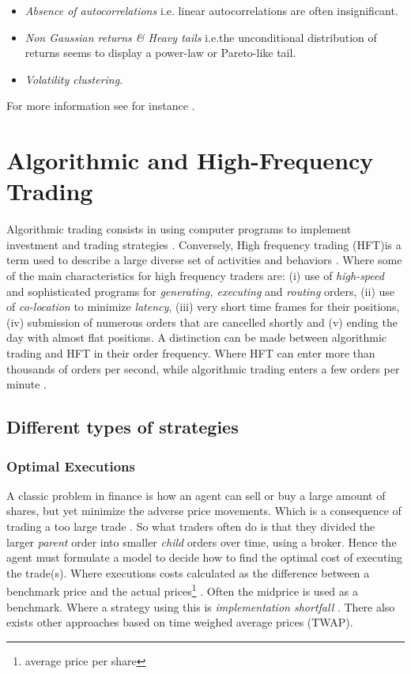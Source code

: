 \documentclass{kththesis}
\theoremstyle{definition}
\begin{document}
\begin{itemize}
    \item \textit{Absence of autocorrelations} i.e. linear autocorrelations are often insignificant. 
    \item \textit{Non Gaussian returns \& Heavy tails} i.e.the unconditional distribution of returns seems to display a power-law or Pareto-like tail.
    \item \textit{Volatility clustering}. 
\end{itemize}
For more information see for instance \textcite{cont2001empirical}.

\section{Algorithmic and High-Frequency Trading}
Algorithmic trading consists in using computer programs to implement investment and trading strategies \parencite{abergel2012market}. Conversely, High frequency trading (HFT)is a term used to describe a large diverse set of activities and behaviors \parencite{o2015high}. Where some of the main characteristics for high frequency traders are: (i) use of \textit{high-speed} and sophisticated programs for \textit{generating, executing} and \textit{routing} orders, (ii) use of \textit{co-location} to minimize \textit{latency}, (iii) very short time frames for their positions, (iv) submission of numerous orders that are cancelled shortly and (v) ending the day with almost flat positions. 
\newline
\newline
A distinction can be made between algorithmic trading and HFT in their order frequency. Where HFT can enter more than thousands of orders per second, while algorithmic trading enters a few orders per minute \parencite{abergel2012market}.

\subsection{Different types of strategies}

\subsubsection*{Optimal Executions}
A classic problem in finance is how an agent can sell or buy a large amount of shares, but yet minimize the adverse price movements. Which is a consequence of trading a too large trade \parencite{cartea2015algorithmic}. So what traders often do is that they divided the larger \textit{parent} order into smaller \textit{child} orders over time, using a broker. Hence the agent must formulate a model to decide how to find the optimal cost of executing the trade(s). Where executions costs calculated as the difference between a benchmark price and the actual prices\footnote{average price per share} \parencite{cartea2015algorithmic}. Often the midprice is used as a benchmark. Where a strategy using this is \textit{implementation shortfall} \parencite{cartea2015algorithmic}. There also exists other approaches based on time weighed average prices (TWAP).
\end{document}
